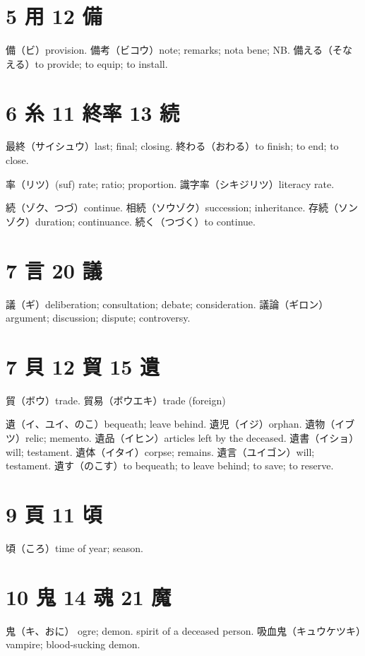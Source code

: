 \section{5 用 12 備}

備（ビ）provision.
備考（ビコウ）note; remarks; nota bene; NB.
備える（そなえる）to provide; to equip; to install.

\section{6 糸 11 終率 13 続}

最終（サイシュウ）last; final; closing.
終わる（おわる）to finish; to end; to close.

率（リツ）(suf) rate; ratio; proportion.
識字率（シキジリツ）literacy rate.

続（ゾク、つづ）continue.
相続（ソウゾク）succession; inheritance.
存続（ソンゾク）duration; continuance.
続く（つづく）to continue.

\section{7 言 20 議}

議（ギ）deliberation; consultation; debate; consideration.
議論（ギロン）argument; discussion; dispute; controversy.

\section{7 貝 12 貿 15 遺}

貿（ボウ）trade.
貿易（ボウエキ）trade (foreign)

遺（イ、ユイ、のこ）bequeath; leave behind.
遺児（イジ）orphan.
遺物（イブツ）relic; memento.
遺品（イヒン）articles left by the deceased.
遺書（イショ）will; testament.
遺体（イタイ）corpse; remains.
遺言（ユイゴン）will; testament.
遺す（のこす）to bequeath; to leave behind; to save; to reserve.

\section{9 頁 11 頃}

頃（ころ）time of year; season.

\section{10 鬼 14 魂 21 魔}

鬼（キ、おに）
ogre; demon.
spirit of a deceased person.
吸血鬼（キュウケツキ）vampire; blood-sucking demon.

